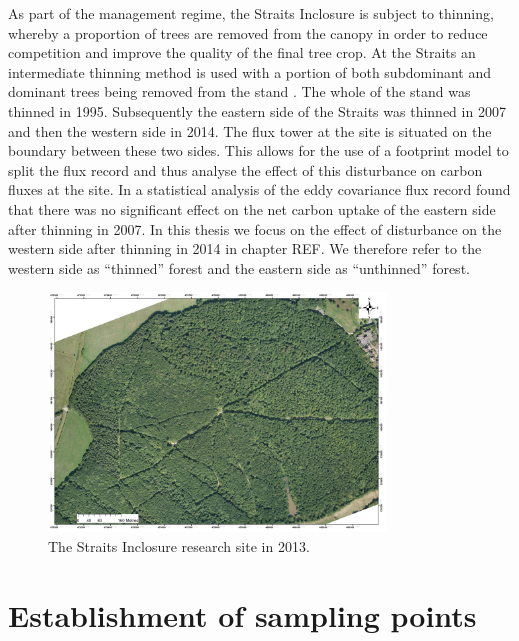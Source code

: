 \documentclass[11pt]{article}
\begin{document}
As part of the management regime, the Straits Inclosure is subject to thinning, whereby a proportion of trees are removed from the canopy in order to reduce competition and improve the quality of the final tree crop. At the Straits an intermediate thinning method is used with a portion of both subdominant and dominant trees being removed from the stand \citep{kerr2011thinning}. The whole of the stand was thinned in 1995. Subsequently the eastern side of the Straits was thinned in 2007 and then the western side in 2014. The flux tower at the site is situated on the boundary between these two sides. This allows for the use of a footprint model to split the flux record and thus analyse the effect of this disturbance on carbon fluxes at the site. In \citet{wilkinson2015effects} a statistical analysis of the eddy covariance flux record found that there was no significant effect on the net carbon uptake of the eastern side after thinning in 2007. In this thesis we focus on the effect of disturbance on the western side after thinning in 2014 in chapter REF. We therefore refer to the western side as ``thinned'' forest and the eastern side as ``unthinned'' forest.   


\begin{figure}[ht]
    \centering
    \includegraphics[width=0.8\textwidth]{AP1_2013.jpg}
    \caption{The Straits Inclosure research site in 2013.} \label{fig:ah_aerial_photo}
\end{figure}

\section{Establishment of sampling points}
\end{document}
